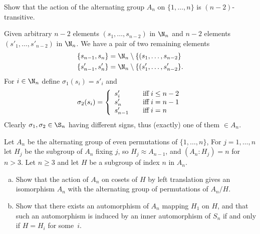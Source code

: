 \documentclass[12pt]{book}
\newcounter{myenumi}
\newenvironment{myenumerate}
{\begin{enumerate}
 \setcounter{enumi}{\themyenumi}
}
{\setcounter{myenumi}{\theenumi}
 \end{enumerate}}
\begin{document}
\begin{myenumerate}
\begin{excopy}
Show that the action of the alternating group \(A_n\)
on \(\{1,\ldots,n\}\) is \((n - 2)\)-transitive.
\end{excopy}

Given arbitrary
\(n-2\) elements \((s_1,\ldots,s_{n-2})\)  in \(\N_n\)
and
\(n-2\) elements \((s'_1,\ldots,s'_{n-2})\)  in \(\N_n\).
We have a pair of two remaining elements
\begin{eqnarray*}
\{s_{n-1}, s_n\} &= \N_n \setminus \{(s_1,\ldots,s_{n-2}\}\\
\{s'_{n-1}, s'_n\} &= \N_n \setminus \{(s'_1,\ldots,s'_{n-2}\}.
\end{eqnarray*}
For \(i\in\N_n\) define  \(\sigma_1(s_i) = s'_i\) and
\begin{equation*}
  \sigma_2(s_i) = 
    \left\{
      \begin{array}{ll}
        s'_i \quad &\textnormal{iff}\; i \leq n - 2 \\
        s'_n \quad &\textnormal{iff}\; i = n - 1 \\
        s'_{n-1} \quad &\textnormal{iff}\; i = n \\
      \end{array}
    \right.
\end{equation*}
Clearly \(\sigma_1,\sigma_2\in\S_n\) having different signs, thus
(exactly) one of them \(\in A_n\).

\begin{excopy}
Let \(A_n\) be the alternating group of even permutations of
\(\{1,\ldots,n\}\), For \(j = 1,\ldots,n\)
let \(H_j\) be the subgroup of \(A_n\) fixing $j$, 
so \(H_j \approx A_{n-1}\), and \((A_n: H_j) = n\) for \(n > 3\).
Let \(n \geq 3\) and let $H$ be a subgroup of index $n$ in \(A_n\).
\begin{enumerate}[(a)]
\item
Show that the action of \(A_n\) on cosets of $H$ by left translation
gives an isomorphism \(A_n\) with the alternating group of permutations
of \(A_n/H\).
\item
Show that there exists an automorphism of \(A_n\) mapping \(H_1\) on $H$,
and that
such an automorphism is induced by an inner automorphism of \(S_n\) if and only
if \(H = H_i\) for some~$i$.
\end{enumerate}
\end{excopy}


\end{myenumerate}
\end{document}
